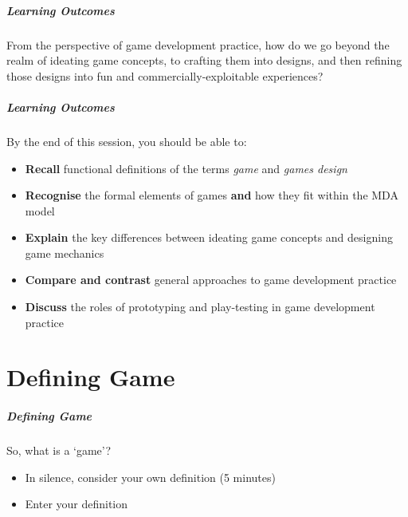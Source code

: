 \begin{frame}
	\frametitle{Learning Outcomes}
	
	From the perspective of game development practice, how do we go beyond the realm of ideating game concepts, to crafting them into designs, and then refining those designs into fun and commercially-exploitable experiences?

\end{frame}

\begin{frame}
	\frametitle{Learning Outcomes}
	
	By the end of this session, you should be able to:
	
	\begin{itemize}
		\item \textbf{Recall} functional definitions of the terms \textit{game} and \textit{games design}
		\item \textbf{Recognise} the formal elements of games \textbf{and} how they fit within the MDA model
		\item \textbf{Explain} the key differences between ideating game concepts and designing game mechanics
		\item \textbf{Compare and contrast} general approaches to game development practice
		\item \textbf{Discuss} the roles of prototyping and play-testing in game development practice
	\end{itemize}
\end{frame}

\part{Defining Game}
\frame{\partpage}

\begin{frame}
	\frametitle{Defining Game}
	
	\socrative
	
	So, what is a `game'?
	
	\begin{itemize}
		\item In silence, consider your own definition (5 minutes)
		\item Enter your definition
	\end{itemize}

\end{frame}

